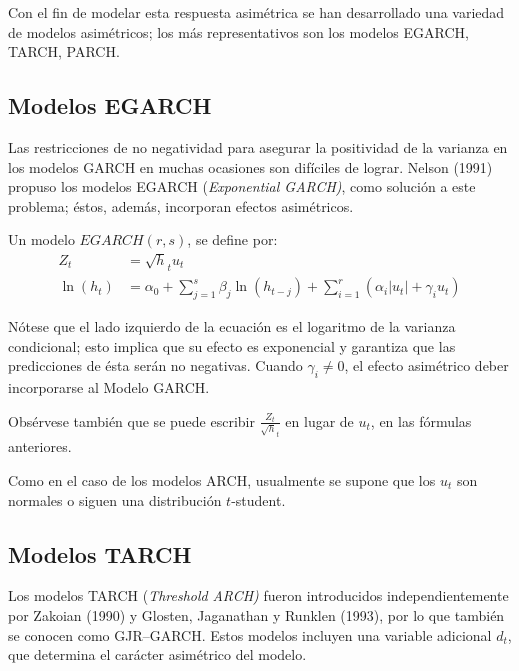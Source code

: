 Con el fin de modelar esta respuesta asim\'{e}trica se han desarrollado una 
variedad de modelos asim\'{e}tricos; los m\'{a}s representativos son los 
modelos EGARCH, TARCH, PARCH. 

\subsection*{Modelos EGARCH}

Las restricciones de no negatividad para asegurar la positividad de la 
varianza en los modelos GARCH en muchas ocasiones son dif\'{i}ciles de 
lograr. Nelson (1991) propuso los modelos EGARCH (\textit{Exponential GARCH)}, como soluci\'{o}n a este problema; \'{e}stos, adem\'{a}s, incorporan efectos asim\'{e}tricos.

\begin{definicion}
  Un modelo $EGARCH(r,s)$, se 
define por:
\begin{align*}
 Z_{t}&=\sqrt h_{t} u_{t} \\ 
 \ln \left( h_{t} \right)&=\alpha_{0}+\sum_{j=1}^s {\beta_{j}\ln 
\left( h_{t-j} \right)} +\sum_{i=1}^r \left( \alpha_{i}\left| u_{t} 
\right|+\gamma_{i}u_{t} \right)
\end{align*}
\end{definicion}

N\'{o}tese que el lado izquierdo de la ecuaci\'{o}n es el logaritmo de la 
varianza condicional; esto implica que su efecto es exponencial y garantiza 
que las predicciones de \'{e}sta ser\'{a}n no negativas. Cuando $\gamma 
_{i}\ne 0$, el efecto asim\'{e}trico deber incorporarse al Modelo GARCH. 

Obs\'{e}rvese tambi\'{e}n que se puede escribir $\frac{Z_{t}}{\sqrt h_{t} }$ 
en lugar de $u_{t}$, en las f\'{o}rmulas anteriores.

Como en el caso de los modelos ARCH, usualmente se supone que los $u_{t}$ 
son normales o siguen una distribuci\'{o}n $t$-student.


\subsection*{Modelos TARCH}

Los modelos TARCH (\textit{Threshold} \textit{ARCH)} fueron introducidos independientemente por Zakoian (1990) y Glosten, Jaganathan y Runklen 
(1993), por lo que tambi\'{e}n se conocen como GJR--GARCH. Estos modelos 
incluyen una variable adicional $d_{t}$, que determina el car\'{a}cter 
asim\'{e}trico del modelo.

